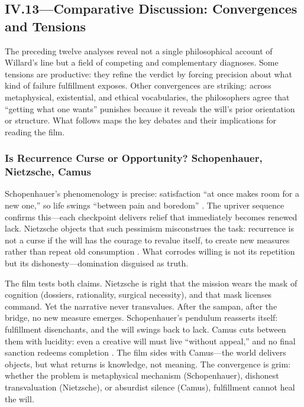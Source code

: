 \subsection*{IV.13—Comparative Discussion: Convergences and Tensions}
\label{ssec:iv-comparative-discussion}

The preceding twelve analyses reveal not a single philosophical account of Willard's line but 
a field of competing and complementary diagnoses. Some tensions are productive: they refine 
the verdict by forcing precision about what kind of failure fulfillment exposes. Other 
convergences are striking: across metaphysical, existential, and ethical vocabularies, the 
philosophers agree that ``getting what one wants'' punishes because it reveals the will's 
prior orientation or structure. What follows maps the key debates and their implications for 
reading the film.

\subsubsection*{Is Recurrence Curse or Opportunity? Schopenhauer, Nietzsche, Camus}

Schopenhauer's phenomenology is precise: satisfaction ``at once makes room for a new one,'' so 
life swings ``between pain and boredom'' \parencite[pp.~312, 319]{SchopenhauerWWR1969}. The 
upriver sequence confirms this---each checkpoint delivers relief that immediately becomes 
renewed lack. Nietzsche objects that such pessimism misconstrues the task: recurrence is not a 
curse if the will has the courage to revalue itself, to create new measures rather than repeat 
old consumption \parencite[\S\S 34, 283]{NietzscheBGE1990}. What corrodes willing is not its 
repetition but its dishonesty---domination disguised as truth.

The film tests both claims. Nietzsche is right that the mission wears the mask of cognition 
(dossiers, rationality, surgical necessity), and that mask licenses command. Yet the narrative 
never transvalues. After the sampan, after the bridge, no new measure emerges. Schopenhauer's 
pendulum reasserts itself: fulfillment disenchants, and the will swings back to lack. Camus 
cuts between them with lucidity: even a creative will must live ``without appeal,'' and no 
final sanction redeems completion \parencite[pp.~28, 54, 121--123]{CamusMyth1991}. The film 
sides with Camus---the world delivers objects, but what returns is knowledge, not meaning. The 
convergence is grim: whether the problem is metaphysical mechanism (Schopenhauer), dishonest 
transvaluation (Nietzsche), or absurdist silence (Camus), fulfillment cannot heal the will.

